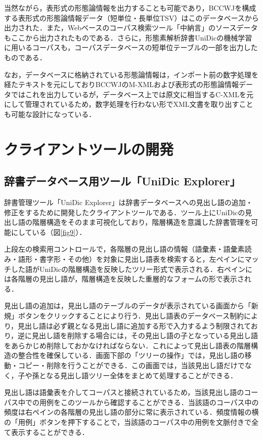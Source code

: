 \documentclass[japanese]{jnlp_1.4}
\begin{document}
当然ながら，表形式の形態論情報を出力することも可能であり，BCCWJを構成する表形式の形態論情報データ（短単位・長単位TSV）はこのデータベースから出力された．また，Webベースのコーパス検索ツール「中納言」のソースデータもここから出力されたものである．さらに，形態素解析辞書UniDicの機械学習に用いるコーパスも，コーパスデータベースの短単位テーブルの一部を出力したものである．

なお，データベースに格納されている形態論情報は，インポート前の数字処理を経たテキストを元にしておりBCCWJのM-XMLおよび表形式の形態論情報データではこれを出力しているが，データベース上では原文に相当するC-XMLを元にして管理されているため，数字処理を行わない形でXML文書を取り出すことも可能な設計になっている．


\section{クライアントツールの開発}
\label{sec:client}

\subsection{辞書データベース用ツール「UniDic Explorer」}

辞書管理ツール「UniDic Explorer」は辞書データベースへの見出し語の追加・修正をするために開発したクライアントツールである．ツール上にUniDicの見出し語の階層構造をそのまま可視化しており，階層構造を意識した辞書管理を可能にしている（図\ref{fig9}）．


上段左の検索用コントロールで，各階層の見出し語の情報（語彙素・語彙素読み・語形・書字形・その他）を対象に見出し語表を検索すると，左ペインにマッチした語がUniDicの階層構造を反映したツリー形式で表示される．右ペインには各階層の見出し語が，階層構造を反映した重層的なフォームの形で表示される．

見出し語の追加は，見出し語のテーブルのデータが表示されている画面から「新規」ボタンをクリックすることにより行う．見出し語表のデータベース制約により，見出し語は必ず親となる見出し語に追加する形で入力するよう制限されており，逆に見出し語を削除する場合には，その見出し語の子となっている見出し語をあらかじめ削除しておかなければならない．これによって見出し語表の階層構造の整合性を確保している．画面下部の「ツリーの操作」では，見出し語の移動・コピー・削除を行うことができる．この画面では，当該見出し語だけでなく，子や孫となる見出し語ツリー全体をまとめて処理することができる．

見出し語は語彙表を介してコーパスと接続されているため，当該見出し語のコーパス中での用例をこのツールから確認することができる．当該語のコーパス中の頻度は右ペインの各階層の見出し語の部分に常に表示されている．頻度情報の横の「用例」ボタンを押下することで，当該語のコーパス中の用例を文脈付きで全て表示することができる．
\end{document}
